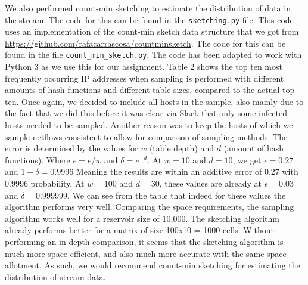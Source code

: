 \documentclass[]{article}
\begin{document}
We also performed count-min sketching to estimate the distribution of data in the stream. The code for this can be found in the \texttt{sketching.py} file. This code uses an implementation of the count-min sketch data structure that we got from \url{https://github.com/rafacarrascosa/countminsketch}. The code for this can be found in the file \texttt{count\_min\_sketch.py}. The code has been adapted to work with Python 3 as we use this for our assignment. Table 2 shows the top ten most frequently occurring IP addresses when sampling is performed with different amounts of hash functions and different table sizes, compared to the actual top ten. Once again, we decided to include all hosts in the sample, also mainly due to the fact that we did this before it was clear via Slack that only some infected hosts needed to be sampled. Another reason was to keep the hosts of which we sample netflows consistent to allow for comparison of sampling methods. The error is determined by the values for $w$ (table depth) and $d$ (amount of hash functions). Where $\epsilon = e/w$ and $\delta = e^{-d}$. At $w=10$ and $d=10$, we get $\epsilon = 0.27$ and $1 - \delta = 0.9996$ Meaning the results are within an additive error of 0.27 with 0.9996 probability. At $w = 100$ and $d = 30$, these values are already at $\epsilon = 0.03$ and $\delta = 0.999999$. We can see from the table that indeed for these values the algorithm performs very well.
Comparing the space requirements, the sampling algorithm works well for a reservoir size of 10,000. The sketching algorithm already performs better for a matrix of size 100x10 = 1000 cells. Without performing an in-depth comparison, it seems that the sketching algorithm is much more space efficient, and also much more accurate with the same space allotment. As such, we would recommend count-min sketching for estimating the distribution of stream data.
\end{document}
